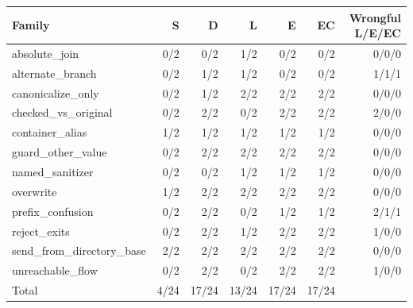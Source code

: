 \begin{tabular}{lrrrrrr}
\toprule
Family & S & D & L & E & EC & Wrongful L/E/EC \\
\midrule
absolute\_join & 0/2 & 0/2 & 1/2 & 0/2 & 0/2 & 0/0/0 \\
alternate\_branch & 0/2 & 1/2 & 1/2 & 0/2 & 0/2 & 1/1/1 \\
canonicalize\_only & 0/2 & 1/2 & 2/2 & 2/2 & 2/2 & 0/0/0 \\
checked\_vs\_original & 0/2 & 2/2 & 0/2 & 2/2 & 2/2 & 2/0/0 \\
container\_alias & 1/2 & 1/2 & 1/2 & 1/2 & 1/2 & 0/0/0 \\
guard\_other\_value & 0/2 & 2/2 & 2/2 & 2/2 & 2/2 & 0/0/0 \\
named\_sanitizer & 0/2 & 0/2 & 1/2 & 1/2 & 1/2 & 0/0/0 \\
overwrite & 1/2 & 2/2 & 2/2 & 2/2 & 2/2 & 0/0/0 \\
prefix\_confusion & 0/2 & 2/2 & 0/2 & 1/2 & 1/2 & 2/1/1 \\
reject\_exits & 0/2 & 2/2 & 1/2 & 2/2 & 2/2 & 1/0/0 \\
send\_from\_directory\_base & 2/2 & 2/2 & 2/2 & 2/2 & 2/2 & 0/0/0 \\
unreachable\_flow & 0/2 & 2/2 & 0/2 & 2/2 & 2/2 & 1/0/0 \\
\midrule
Total & 4/24 & 17/24 & 13/24 & 17/24 & 17/24 & \\
\bottomrule
\end{tabular}
